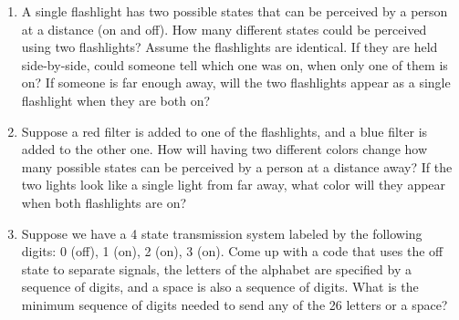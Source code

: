 \begin{enumerate}
	\item A single flashlight has two possible states that can be perceived by a person at a distance (on and off). How many different states could be perceived using two flashlights? Assume the flashlights are identical. If they are held side-by-side, could someone tell which one was on, when only one of them is on? If someone is far enough away, will the two flashlights appear as a single flashlight when they are both on?
	
	\item Suppose a red filter is added to one of the flashlights, and a blue filter is added to the other one. How will having two different colors change how many possible states can be perceived by a person at a distance away? If the two lights look like a single light from far away, what color will they appear when both flashlights are on?
	
	\item Suppose we have a 4 state transmission system labeled by the following digits: 0 (off), 1 (on), 2 (on), 3 (on). Come up with a code that uses the off state to separate signals, the letters of the alphabet are specified by a sequence of digits, and a space is also a sequence of digits. What is the minimum sequence of digits needed to send any of the 26 letters or a space? 
\end{enumerate}